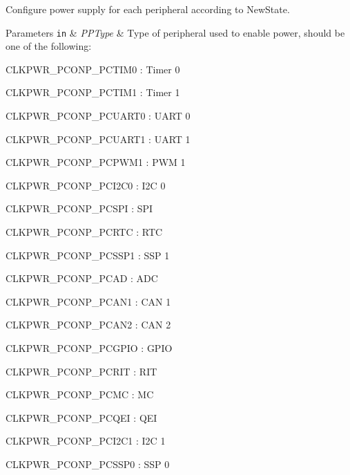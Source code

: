 \-Configure power supply for each peripheral according to \-New\-State. 


\begin{DoxyParams}[1]{\-Parameters}
\mbox{\tt in}  & {\em \-P\-P\-Type} & \-Type of peripheral used to enable power, should be one of the following\-:
\begin{DoxyItemize}
\item \-C\-L\-K\-P\-W\-R\-\_\-\-P\-C\-O\-N\-P\-\_\-\-P\-C\-T\-I\-M0 \-: \-Timer 0
\begin{DoxyItemize}
\item \-C\-L\-K\-P\-W\-R\-\_\-\-P\-C\-O\-N\-P\-\_\-\-P\-C\-T\-I\-M1 \-: \-Timer 1
\item \-C\-L\-K\-P\-W\-R\-\_\-\-P\-C\-O\-N\-P\-\_\-\-P\-C\-U\-A\-R\-T0 \-: \-U\-A\-R\-T 0
\item \-C\-L\-K\-P\-W\-R\-\_\-\-P\-C\-O\-N\-P\-\_\-\-P\-C\-U\-A\-R\-T1 \-: \-U\-A\-R\-T 1
\item \-C\-L\-K\-P\-W\-R\-\_\-\-P\-C\-O\-N\-P\-\_\-\-P\-C\-P\-W\-M1 \-: \-P\-W\-M 1
\item \-C\-L\-K\-P\-W\-R\-\_\-\-P\-C\-O\-N\-P\-\_\-\-P\-C\-I2\-C0 \-: \-I2\-C 0
\item \-C\-L\-K\-P\-W\-R\-\_\-\-P\-C\-O\-N\-P\-\_\-\-P\-C\-S\-P\-I \-: \-S\-P\-I
\item \-C\-L\-K\-P\-W\-R\-\_\-\-P\-C\-O\-N\-P\-\_\-\-P\-C\-R\-T\-C \-: \-R\-T\-C
\item \-C\-L\-K\-P\-W\-R\-\_\-\-P\-C\-O\-N\-P\-\_\-\-P\-C\-S\-S\-P1 \-: \-S\-S\-P 1
\item \-C\-L\-K\-P\-W\-R\-\_\-\-P\-C\-O\-N\-P\-\_\-\-P\-C\-A\-D \-: \-A\-D\-C
\item \-C\-L\-K\-P\-W\-R\-\_\-\-P\-C\-O\-N\-P\-\_\-\-P\-C\-A\-N1 \-: \-C\-A\-N 1
\item \-C\-L\-K\-P\-W\-R\-\_\-\-P\-C\-O\-N\-P\-\_\-\-P\-C\-A\-N2 \-: \-C\-A\-N 2
\item \-C\-L\-K\-P\-W\-R\-\_\-\-P\-C\-O\-N\-P\-\_\-\-P\-C\-G\-P\-I\-O \-: \-G\-P\-I\-O
\item \-C\-L\-K\-P\-W\-R\-\_\-\-P\-C\-O\-N\-P\-\_\-\-P\-C\-R\-I\-T \-: \-R\-I\-T
\item \-C\-L\-K\-P\-W\-R\-\_\-\-P\-C\-O\-N\-P\-\_\-\-P\-C\-M\-C \-: \-M\-C
\item \-C\-L\-K\-P\-W\-R\-\_\-\-P\-C\-O\-N\-P\-\_\-\-P\-C\-Q\-E\-I \-: \-Q\-E\-I
\item \-C\-L\-K\-P\-W\-R\-\_\-\-P\-C\-O\-N\-P\-\_\-\-P\-C\-I2\-C1 \-: \-I2\-C 1
\item \-C\-L\-K\-P\-W\-R\-\_\-\-P\-C\-O\-N\-P\-\_\-\-P\-C\-S\-S\-P0 \-: \-S\-S\-P 0

\end{DoxyItemize}
\end{DoxyItemize}
\end{DoxyParams}
